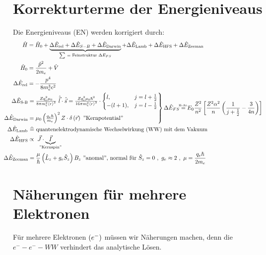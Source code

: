 \documentclass[Ex4_Zusammenfassung.tex]{subfiles}
\begin{document}
\section{Korrekturterme der Energieniveaus}
Die Energieniveaus (EN) werden korrigiert durch:
\begin{align*}
	\hat{H} &= \hat{H}_0 + \underbrace{ \Delta \hat{E}_{\text{rel}} + \Delta \hat{E}_{S-B} + \Delta \hat{E}_{\text{Darwin}} }_{\mathclap{\sum\ = \text{ Feinstruktur } \Delta E_{FS}} } + \Delta \hat{E}_{\text{Lamb}} + \Delta \hat{E}_{\text{HFS}} + \Delta \hat{E}_{\text{Zeeman}}\\
	\hat{H}_0 &= \frac{\hat{p}^2}{2m_e} + \hat{V}\\
	\Delta \hat{E}_{\text{rel}} &= - \frac{p^4}{8 m_e^3 c^2} \\
	& \kern -3.1em \begin{rcases}
		\Delta \hat{E}_{\text{S-B}} = \frac{Z q_e^2 \mu_0}{8 \pi m_e^2 \braket{r}^3}\ \hat{\vec{l}} \cdot \hat{\vec{s}} = \frac{Z q_e^2 \mu_0 \hslash^2}{16 \pi m_e^2 \braket{r}^3} \cdot 
			\begin{cases}
				l,&  j=l+\frac{1}{2}\\
				-(l+1) ,& j=l-\frac{1}{2}
			\end{cases} \\
	\kern -1.3em \Delta \hat{E}_{\text{Darwin}} = \mu_0 \lp \frac{q_e \hslash}{m_e} \rp^2 Z \cdot \delta\lp \vec{r} \rp\  \text{''Kernpotential''} 
	\end{rcases}
	\Delta \hat{E}_{FS} \stackrel{\mathclap{\text{\tiny{H-At.}}}}{=} E_0 \frac{Z^2}{n^2} \left[ \frac{Z^2 \alpha^2}{n} \lp \frac{1}{j+\frac{1}{2}} - \frac{3}{4n} \rp  \right] \\
	& \kern -3.55em \Delta \hat{E}_{\text{Lamb}}\  \widehat{=} \text{ quantenelektrodynamische Wechselwirkung (WW) mit dem Vakuum}\\
	& \kern -3.1em \Delta \hat{E}_{\text{HFS}} \propto\ \vec{J} \cdot \underbrace{\vec{I}}_{\mathclap{\text{''Kernspin''}}}\\
	& \kern -4.2em \Delta \hat{E}_{\text{Zeeman}} = \frac{\mu}{\hslash} \lp \hat{L}_z + g_e \hat{S}_z \rp B_z\ \text{''anomal'', normal für } \hat{S}_z = 0\ ,\ g_e \approx 2\ ,\ \mu = \frac{q_e \hslash}{2m_e}
\end{align*}

\section{Näherungen für mehrere Elektronen}
Für mehrere Elektronen $ \left( e^- \right) $ müssen wir Näherungen machen, denn die $ e^- - e^- - WW$ verhindert das analytische Lösen. \\
\end{document}

